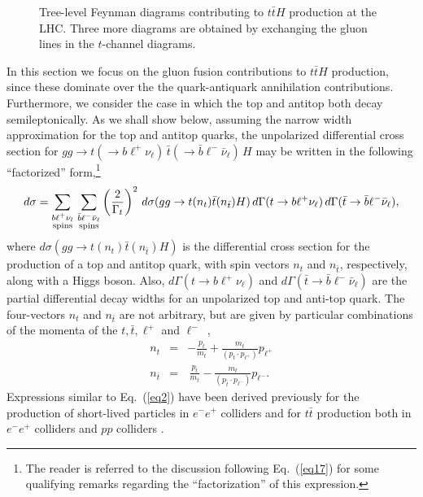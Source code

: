 \documentclass[aps,preprint,tightenlines,floatfix,superscriptaddress,nofootinbib,showpacs]{revtex4-1}
\def\beq{\begin{equation}}
\def\eeq{\end{equation}}
\def\bea{\begin{eqnarray}}
\def\eea{\end{eqnarray}}
\def\tbar{\bar{t}}
\def\bbar{\bar{b}}
\def\nubar{{\bar{\nu}}_{\ell}}
\begin{document}
\begin{center}
\begin{figure}[H]
\vspace*{0.02\textwidth}
\caption{Tree-level Feynman diagrams contributing to $t\tbar H$ production
  at the LHC. Three more diagrams are obtained by exchanging the gluon
  lines in the $t$-channel diagrams.}
\label{fig1}
\end{figure}
\end{center}
In this section we focus on the gluon fusion contributions
to $t\tbar H$ production, since these dominate over the
the quark-antiquark annihilation contributions.  Furthermore,
we consider the case in which the top and antitop both decay
semileptonically.  As we shall show below, assuming the
narrow width approximation for the top and antitop quarks, the unpolarized
differential cross section for $gg\to t(\to
b{\ell}^+\nu_{\ell})\,\tbar(\to \bbar {\ell}^- \nubar)\,H$ may be
written in the following ``factorized'' form,\footnote{The reader
  is referred to the discussion following Eq.~(\ref{eq17}) for some qualifying
  remarks regarding the ``factorization'' of this expression.}
%
\beq
\label{eq2}
d\sigma =\sum_{\substack{b{\ell}^+\nu_l \\ \tiny{\mathrm{spins}}}}\,
   \sum_{\substack{\bbar {\ell}^-\nubar \\ \mathrm{\tiny{spins}}}}\left(\frac{2}{\Gamma_t}\right)^2\,
   d\sigma(gg\to t(n_t)\tbar (n_{\tbar})H)\,
   d\Gamma(t\to b{\ell}^+\nu_{\ell})\,
   d\Gamma(\tbar \to \bbar {\ell}^-\nubar),
\eeq  
%
where $d\sigma(gg\to t(n_t)\tbar (n_{\tbar})H)$ is the differential
cross section for the production of a top and antitop quark,
with spin vectors $n_t$ and $n_{\bar{t}}$, respectively, along with a Higgs
boson.  Also, $d\Gamma(t\to b{\ell}^+\nu_{\ell})$ and
$d\Gamma(\tbar \to \bbar {\ell}^-\nubar)$ are the
partial differential decay widths for an unpolarized top and
anti-top quark.  The four-vectors
$n_t$ and $n_{\tbar}$ are not arbitrary, but are
given by particular combinations of the
momenta of the $t,\tbar, \ell^+$ and $\ell^-$~\cite{Arens},
%
\bea
\label{eq3}
n_t&=&-\frac{p_t}{m_t}+\frac{m_t}{(p_t\cdot p_{{\ell}^+})}p_{{\ell}^+}\\
\label{eq4}
n_{\tbar}&=&\,\frac{p_{\tbar}}{m_t}-\frac{m_t}{(p_{\tbar}\cdot p_{{\ell}^-})}p_{{\ell}^-}.
\eea
%
Expressions similar to Eq.~(\ref{eq2}) have been derived previously for the
production of short-lived particles in $e^-e^+$ colliders
\cite{kawasaki} and for $t\tbar$ production both in
$e^-e^+$ colliders \cite{Arens} and $pp$ colliders
\cite{ale1,*ale2,*ale3,*ale4}. \par
\end{document}
